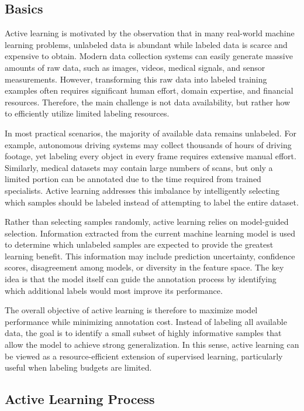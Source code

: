 \documentclass{article}
\begin{document}
\subsection{Basics}

Active learning is motivated by the observation that in many real-world machine learning problems, unlabeled data is abundant while labeled data is scarce and expensive to obtain. Modern data collection systems can easily generate massive amounts of raw data, such as images, videos, medical signals, and sensor measurements. However, transforming this raw data into labeled training examples often requires significant human effort, domain expertise, and financial resources. Therefore, the main challenge is not data availability, but rather how to efficiently utilize limited labeling resources.

In most practical scenarios, the majority of available data remains unlabeled. For example, autonomous driving systems may collect thousands of hours of driving footage, yet labeling every object in every frame requires extensive manual effort. Similarly, medical datasets may contain large numbers of scans, but only a limited portion can be annotated due to the time required from trained specialists. Active learning addresses this imbalance by intelligently selecting which samples should be labeled instead of attempting to label the entire dataset.

Rather than selecting samples randomly, active learning relies on model-guided selection. Information extracted from the current machine learning model is used to determine which unlabeled samples are expected to provide the greatest learning benefit. This information may include prediction uncertainty, confidence scores, disagreement among models, or diversity in the feature space. The key idea is that the model itself can guide the annotation process by identifying which additional labels would most improve its performance.

The overall objective of active learning is therefore to maximize model performance while minimizing annotation cost. Instead of labeling all available data, the goal is to identify a small subset of highly informative samples that allow the model to achieve strong generalization. In this sense, active learning can be viewed as a resource-efficient extension of supervised learning, particularly useful when labeling budgets are limited.

\subsection{Active Learning Process}
\end{document}
